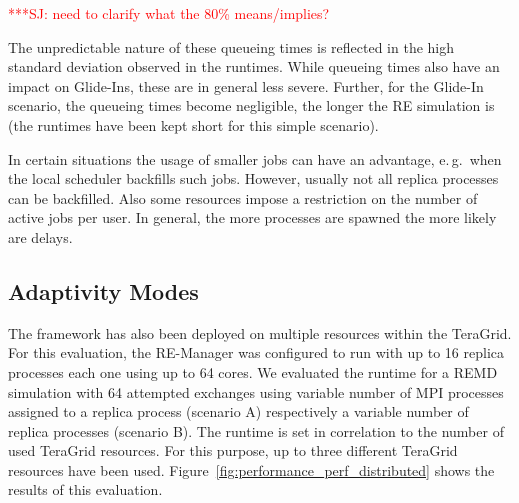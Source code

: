 \documentclass{rspublic}
\newcommand{\jhanote}[1]{ {\textcolor{red} { ***SJ: #1 }}}
\newcommand{\jhanote}[1]{}
\begin{document}
{\jhanote{need to clarify what the 80\% means/implies?}

The unpredictable nature of these queueing times is reflected in the
high standard deviation observed in the runtimes. While queueing times
also have an impact on Glide-Ins, these are in general less severe.
Further, for the Glide-In scenario, the queueing times become
negligible, the longer the RE simulation is (the runtimes have been
kept short for this simple scenario). 
                                                           
In certain situations the usage of smaller jobs can have an advantage,
e.\,g.\ when the local scheduler backfills such jobs. However, usually
not all replica processes can be backfilled. Also some resources
impose a restriction on the number of active jobs per user.  In
general, the more processes are spawned the more likely are delays.   

\subsection{Adaptivity Modes}

The framework has also been deployed on multiple resources within the
TeraGrid.  For this evaluation, the RE-Manager was configured to run
with up to 16 replica processes each one using up to 64 cores.  
We evaluated the runtime for a REMD simulation with 64 attempted 
exchanges using variable number of MPI processes assigned 
to a replica process (scenario A) respectively a variable 
number of replica processes (scenario B). The runtime is set 
in correlation to the number of used TeraGrid resources. For this purpose,
up to three different TeraGrid resources have been used.
Figure~\ref{fig:performance_perf_distributed}
shows the results of this evaluation.

}
\end{document}
